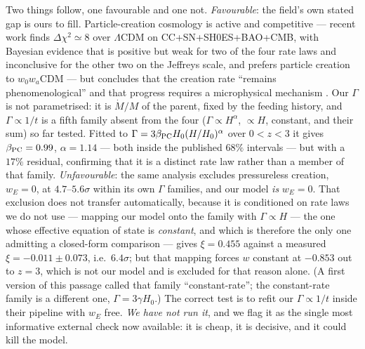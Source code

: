 \documentclass[11pt]{article}
\begin{document}
Two things follow, one favourable and one not.
\emph{Favourable}: the field's own stated gap is ours to fill. Particle-creation cosmology is
active and competitive --- recent work finds $\Delta\chi^2 \simeq 8$ over $\Lambda$CDM on
CC+SN+SH0ES+BAO+CMB, with Bayesian evidence that is positive but weak for two of the four rate
laws and inconclusive for the other two on the Jeffreys scale, and prefers particle creation to
$w_0w_a$CDM --- but concludes that the creation rate ``remains phenomenological'' and that
progress requires a microphysical mechanism \cite{Schiavone2026}. Our $\Gamma$ is not
parametrised: it is $\dot M/M$ of the parent, fixed by the feeding history, and $\Gamma
\propto 1/t$ is a fifth family absent from the four ($\Gamma \propto H^\alpha$, $\propto H$,
constant, and their sum) so far tested. Fitted to $\Gamma = 3\beta_{\rm PC}H_0(H/H_0)^\alpha$
over $0<z<3$ it gives $\beta_{\rm PC} = 0.99$, $\alpha = 1.14$ --- both inside the published
$68\%$ intervals --- but with a $17\%$ residual, confirming that it is a distinct rate law
rather than a member of that family.
\emph{Unfavourable}: the same analysis excludes pressureless creation, $w_E = 0$, at
$4.7$--$5.6\sigma$ within its own $\Gamma$ families, and our model \emph{is} $w_E = 0$. That
exclusion does not transfer automatically, because it is conditioned on rate laws we do not
use --- mapping our model onto the family with $\Gamma \propto H$ --- the one whose effective equation of
state is \emph{constant}, and which is therefore the only one admitting a closed-form comparison
--- gives $\xi = 0.455$ against a measured $\xi = -0.011 \pm 0.073$, i.e.\ $6.4\sigma$; but that
mapping forces $w$ constant at $-0.853$ out to $z=3$, which is not our model and is excluded for
that reason alone. (A first version of this passage called that family ``constant-rate''; the
constant-rate family is a different one, $\Gamma = 3\gamma H_0$.) The correct test
is to refit our $\Gamma \propto 1/t$ inside their pipeline with $w_E$ free. \emph{We have not
run it}, and we flag it as the single most informative external check now available: it is
cheap, it is decisive, and it could kill the model.
\end{document}
